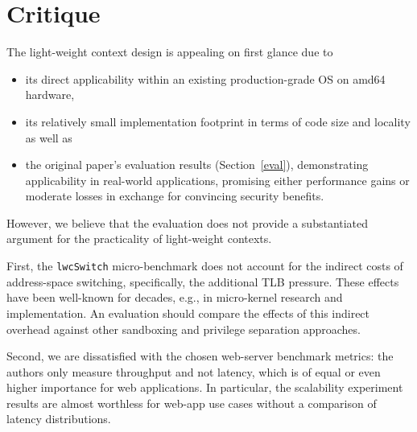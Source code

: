 \documentclass[10pt,twocolumn,a4paper]{article}
\begin{document}
\section{Critique}\label{eval:crit}
The light-weight context design is appealing on first glance due to
\begin{itemize}[nosep]
  \item its direct applicability within an existing production-grade OS on amd64 hardware,
  \item its relatively small implementation footprint in terms of code size and locality as well as
  \item the original paper's evaluation results (Section~\ref{eval}), demonstrating applicability in real-world applications, promising either performance gains or moderate losses in exchange for convincing security benefits.
\end{itemize}
However, we believe that the evaluation does not provide a substantiated argument for the practicality of light-weight contexts.

First, the \lstinline{lwcSwitch} micro-benchmark does not account for the indirect costs of address-space switching, specifically, the additional TLB pressure.
These effects have been well-known for decades, e.g., in micro-kernel research  and implementation. \cite{liedtke1997achievedipcperformance} 
An evaluation should compare the effects of this indirect overhead against other sandboxing and privilege separation approaches.

Second, we are dissatisfied with the chosen web-server benchmark metrics:
the authors only measure throughput and not latency, which is of equal or even higher importance for web applications.
In particular, the scalability experiment results are almost worthless for web-app use cases without a comparison of latency distributions.
\end{document}
